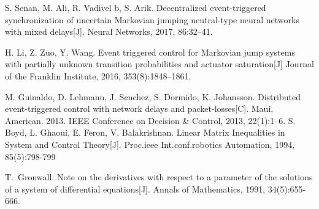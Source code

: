 \begin{thebibliography}{99}
S. Senan, M. Ali, R. Vadivel b, S. Arik.
Decentralized event-triggered synchronization of uncertain Markovian jumping neutral-type neural networks with mixed delays[J]. Neural Networks, 2017, 86:32–41.

H. Li, Z. Zuo, Y. Wang.
Event triggered control for Markovian jump systems with partially unknown transition probabilities and actuator saturation[J]
Journal of the Franklin Institute, 2016, 353(8):1848–1861.



 M. Guinaldo, D. Lehmann, J. S¢nchez, S. Dormido, K. Johansson. Distributed event-triggered control with network delays and packet-losses[C]. Maui, American. 2013. IEEE Conference on Decision \& Control, 2013, 22(1):1–6.
 S. Boyd, L. Ghaoui, E. Feron, V. Balakrishnan. Linear Matrix Inequalities in System and Control Theory[J]. Proc.ieee Int.conf.robotics Automation, 1994, 85(5):798-799



T.~Gronwall.
 Note on the derivatives with respect to a parameter of the solutions of a system of differential equations[J].
 Annals of Mathematics, 1991, 34(5):655-666.


\end{thebibliography}
